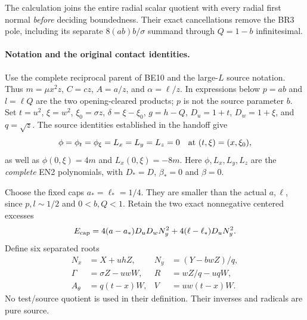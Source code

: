 The calculation joins the entire radial scalar quotient with every
radial first normal \emph{before} deciding boundedness. Their exact
cancellations remove the BR3 pole, including its separate
$8(ab)b/\sigma$ summand through $Q=1-b$ infinitesimal.

\paragraph{Notation and the original contact identities.}
Use the complete reciprocal parent of BE10 and the large-$L$ source
notation. Thus $m=\mu x^2z$, $C=cz$, $A=a/z$, and
$\alpha=\ell/z$. In expressions below $p=ab$ and $l=\ell Q$ are
the two opening-cleared products; $p$ is not the source parameter $b$.
Set $t=u^2$, $\xi=w^2$, $\xi_0=\sigma z$, $\delta=\xi-\xi_0$,
$g=h-Q$, $D_u=1+t$, $D_w=1+\xi$, and $q=\sqrt z$.
The source identities established in the handoff give
\[
 \phi=\phi_t=\phi_\xi=L_x=L_y=L_z=0
 \quad\hbox{at }(t,\xi)=(x,\xi_0),
\]
as well as $\phi(0,\xi)=4m$ and $L_x(0,\xi)=-8m$.
Here $\phi,L_x,L_y,L_z$ are the \emph{complete} EN2 polynomials,
with $D_*=D$, $\beta_*=0$ and $\beta=0$.

Choose the fixed caps $a_* = \ell_* =1/4$. They are smaller than
the actual $a,\ell$, since $p,l\sim1/2$ and $0<b,Q<1$.
Retain the two exact nonnegative centered excesses
\[
 E_{\rm cap}=4(a-a_*)D_uD_wN_y^2+4(\ell-\ell_*)D_uN_y^2.
\]
Define six separated roots
\[
\begin{aligned}
N_x&=X+uhZ,&N_y&=(Y-bwZ)/q,\\
\Gamma&=\sigma Z-uwW,&R&=wZ/q-uqW,\\
A_\theta&=q(t-x)W,&V&=uw(t-x)W.
\end{aligned}\tag{JR1}
\]
No test/source quotient is used in their definition. Their inverses
and radicals are pure source.


